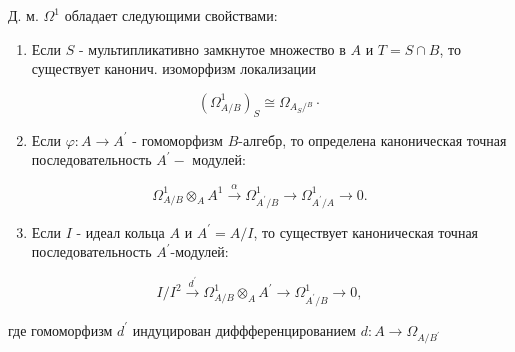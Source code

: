 \documentclass[10pt]{article}
\begin{document}
Д. м. $\Omega^{1}$ обладает следующими свойствами:



\begin{enumerate}

  \item Если $S$ - мультипликативно замкнутое множество в $A$ и $T=S \cap B$, то существует канонич. изоморфизм локализации

\end{enumerate}



\[

\left(\Omega_{A / B}^{1}\right)_{S} \cong \Omega_{A_{S} /{ }^{B}} \cdot

\]



\begin{enumerate}

  \setcounter{enumi}{1}

  \item Если $\varphi: A \rightarrow A^{\prime}$ - гомоморфизм $B$-алгебр, то определена каноническая точная последовательность $A^{\prime}-$ модулей:

\end{enumerate}



\[

\Omega_{A / B}^{1} \otimes_{A} A^{1} \stackrel{\alpha}{\longrightarrow} \Omega_{A^{\prime} / B}^{1} \longrightarrow \Omega_{A^{\prime} / A}^{1} \longrightarrow 0 .

\]



\begin{enumerate}

  \setcounter{enumi}{2}

  \item Если $I$ - идеал кольца $A$ и $A^{\prime}=A / I$, то существует каноническая точная последовательность $A^{\prime}$-модулей:

\end{enumerate}



\[

I / I^{2} \stackrel{d^{\prime}}{\longrightarrow} \Omega_{A / B}^{1} \otimes_{A} A^{\prime} \longrightarrow \Omega_{A^{\prime} / B}^{1} \longrightarrow 0,

\]



где гомоморфизм $d^{\prime}$ индуцирован диффференцированием $d: A \rightarrow \Omega_{A / B^{\prime}}$
\end{document}
